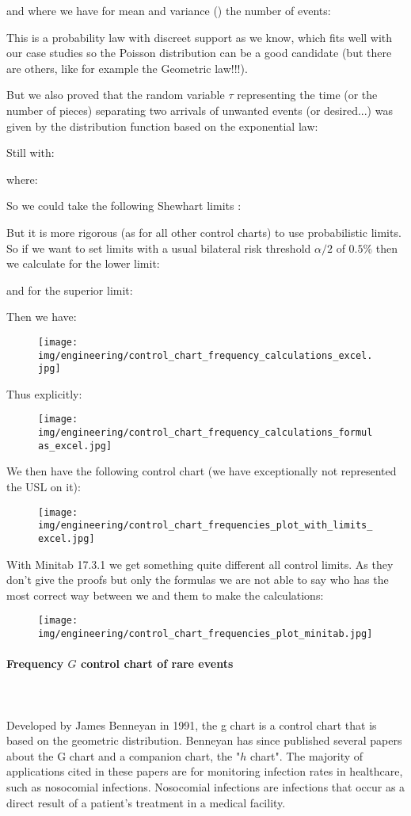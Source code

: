 	and where we have for mean and variance () the number of events:
	
	This is a probability law with discreet support as we know, which fits well with our case studies so the Poisson distribution can be a good candidate (but there are others, like for example the Geometric law!!!).

	But we also proved that the random variable $\tau$ representing the time (or the number of pieces) separating two arrivals of unwanted events (or desired...) was given by the distribution function based on the exponential law:
	
	Still with:
	
	where:
	
	So we could take the following Shewhart limits :
	
	But it is more rigorous (as for all other control charts) to use probabilistic limits. So if we want to set limits with a usual bilateral risk threshold $\alpha/2$ of $0.5\%$ then we calculate for the lower limit:
	
	and for the superior limit:
	
	Then we have:
	\begin{figure}[H]
		\centering
		\texttt{[image: img/engineering/control\_chart\_frequency\_calculations\_excel.jpg]}
	\end{figure}
	Thus explicitly:
	\begin{figure}[H]
		\centering
		\texttt{[image: img/engineering/control\_chart\_frequency\_calculations\_formulas\_excel.jpg]}
	\end{figure}
	We then have the following control chart (we have exceptionally not represented the USL on it):
	\begin{figure}[H]
		\centering
		\texttt{[image: img/engineering/control\_chart\_frequencies\_plot\_with\_limits\_excel.jpg]}
	\end{figure}
	With Minitab 17.3.1 we get something quite different all control limits. As they don't give the proofs but only the formulas we are not able to say who has the most correct way between we and them to make the calculations:
	\begin{figure}[H]
		\centering
		\texttt{[image: img/engineering/control\_chart\_frequencies\_plot\_minitab.jpg]}
	\end{figure}
	
	\paragraph{Frequency $G$ control chart of rare events}\mbox{}\\\\
	Developed by James Benneyan in 1991, the g chart  is a control chart that is based on the geometric distribution. Benneyan has since published several papers about the G chart and a companion chart, the "$h$ chart". The majority of applications cited in these papers are for monitoring infection rates in healthcare, such as nosocomial infections. Nosocomial infections are infections that occur as a direct result of a patient’s treatment in a medical facility.

